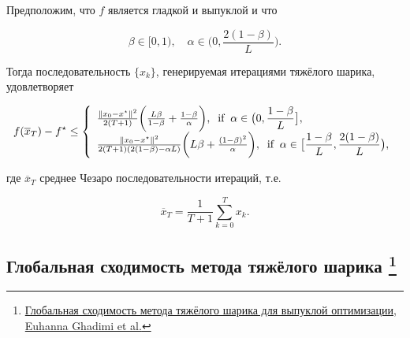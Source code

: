 \documentclass[
  russian,
  letterpaper,
  DIV=11,
  numbers=noendperiod]{scrartcl}
\begin{document}
\begin{tcolorbox}[enhanced jigsaw, titlerule=0mm, opacityback=0, toptitle=1mm, colback=white, bottomtitle=1mm, toprule=.15mm, opacitybacktitle=0.6, title=\textcolor{quarto-callout-color}{\faInfo}\hspace{0.5em}{Theorem}, rightrule=.15mm, left=2mm, breakable, coltitle=black, arc=.35mm, leftrule=.75mm, colbacktitle=quarto-callout-color!10!white, bottomrule=.15mm, colframe=quarto-callout-color-frame]

Предположим, что \(f\) является гладкой и выпуклой и что

\[
\beta\in[0,1),\quad \alpha\in\biggl(0,\dfrac{2(1-\beta)}{L}\biggr).
\]

Тогда последовательность \(\{x_k\}\), генерируемая итерациями тяжёлого
шарика, удовлетворяет

\[
f(\overline{x}_T)-f^{\star} \leq  \left\{
\begin{array}[l]{ll}
\frac{\Vert x_{0}-x^\star\Vert^2}{2(T+1)}\biggl(\frac{L\beta}{1-\beta}+\frac{1-\beta}{\alpha}\biggr),\;\;\textup{if}\;\;
\alpha\in\bigl(0,\dfrac{1-\beta}{L}\bigr],\\
\frac{\Vert x_{0}-x^\star\Vert^2}{2(T+1)(2(1-\beta)-\alpha L)}\biggl({L\beta}+\frac{(1-\beta)^2}{\alpha}\biggr),\;\;\textup{if}\;\;
\alpha\in\bigl[\dfrac{1-\beta}{L},\dfrac{2(1-\beta)}{L}\bigr),
\end{array}
\right.
\]

где \(\overline{x}_T\) среднее Чезаро последовательности итераций, т.е.

\[
\overline{x}_T = \frac{1}{T+1}\sum_{k=0}^T x_k.
\]

\end{tcolorbox}

\subsection[Глобальная сходимость метода тяжёлого шарика
]{\texorpdfstring{Глобальная сходимость метода тяжёлого шарика
\footnote{\href{https://arxiv.org/abs/1412.7457}{Глобальная сходимость
  метода тяжёлого шарика для выпуклой оптимизации, Euhanna Ghadimi et
  al.}}}{Глобальная сходимость метода тяжёлого шарика }}\label{ux433ux43bux43eux431ux430ux43bux44cux43dux430ux44f-ux441ux445ux43eux434ux438ux43cux43eux441ux442ux44c-ux43cux435ux442ux43eux434ux430-ux442ux44fux436ux451ux43bux43eux433ux43e-ux448ux430ux440ux438ux43aux430-1}
\end{document}
